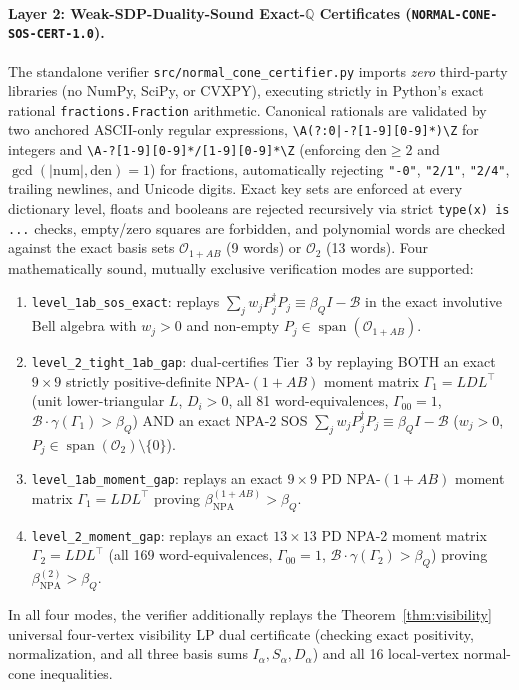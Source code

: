 \documentclass[11pt,a4paper]{article}
\newcommand{\QQ}{\mathbb{Q}}
\newcommand{\calB}{\mathcal{B}}
\begin{document}
\paragraph{Layer 2: Weak-SDP-Duality-Sound Exact-$\QQ$ Certificates (\texttt{NORMAL-CONE-SOS-CERT-1.0}).}
The standalone verifier \texttt{src/normal\_cone\_certifier.py} imports \emph{zero} third-party libraries (no NumPy, SciPy, or CVXPY), executing strictly in Python's exact rational \texttt{fractions.\allowbreak Fraction} arithmetic.
Canonical rationals are validated by two anchored ASCII-only regular expressions, \verb+\A(?:0|-?[1-9][0-9]*)\Z+ for integers and \verb+\A-?[1-9][0-9]*/[1-9][0-9]*\Z+ (enforcing $\text{den} \ge 2$ and $\gcd(|\text{num}|, \text{den}) = 1$) for fractions, automatically rejecting \texttt{"-0"}, \texttt{"2/1"}, \texttt{"2/4"}, trailing newlines, and Unicode digits.
Exact key sets are enforced at every dictionary level, floats and booleans are rejected recursively via strict \texttt{type(x) is ...} checks, empty/zero squares are forbidden, and polynomial words are checked against the exact basis sets $\mathcal{O}_{1+AB}$ (9 words) or $\mathcal{O}_2$ (13 words).
Four mathematically sound, mutually exclusive verification modes are supported:
\begin{enumerate}[leftmargin=1.8em,itemsep=1pt]
  \item \texttt{level\_1ab\_sos\_exact}: replays $\sum_j w_j P_j^\dagger P_j \equiv \beta_Q I - \calB$ in the exact involutive Bell algebra with $w_j > 0$ and non-empty $P_j \in \operatorname{span}(\mathcal{O}_{1+AB})$.
  \item \texttt{level\_2\_tight\_1ab\_gap}: dual-certifies Tier~3 by replaying BOTH an exact $9\times 9$ strictly positive-definite NPA-$(1+AB)$ moment matrix $\Gamma_1 = L D L^\top$ (unit lower-triangular $L$, $D_i > 0$, all 81 word-equivalences, $\Gamma_{00} = 1$, $\calB\cdot\gamma(\Gamma_1) > \beta_Q$) AND an exact NPA-2 SOS $\sum_j w_j P_j^\dagger P_j \equiv \beta_Q I - \calB$ ($w_j > 0$, $P_j \in \operatorname{span}(\mathcal{O}_2) \setminus \{0\}$).
  \item \texttt{level\_1ab\_moment\_gap}: replays an exact $9\times 9$ PD NPA-$(1+AB)$ moment matrix $\Gamma_1 = L D L^\top$ proving $\beta_{\mathrm{NPA}}^{(1+AB)} > \beta_Q$.
  \item \texttt{level\_2\_moment\_gap}: replays an exact $13\times 13$ PD NPA-2 moment matrix $\Gamma_2 = L D L^\top$ (all 169 word-equivalences, $\Gamma_{00} = 1$, $\calB\cdot\gamma(\Gamma_2) > \beta_Q$) proving $\beta_{\mathrm{NPA}}^{(2)} > \beta_Q$.
\end{enumerate}
In all four modes, the verifier additionally replays the Theorem~\ref{thm:visibility} universal four-vertex visibility LP dual certificate (checking exact positivity, normalization, and all three basis sums $I_\alpha, S_\alpha, D_\alpha$) and all 16 local-vertex normal-cone inequalities.
\end{document}
